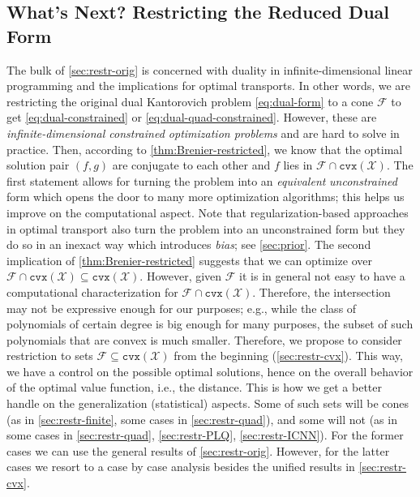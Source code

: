 \documentclass[10pt]{article}
\newcommand{\cvx}{\mathtt{cvx}}
\newcommand{\calF}{\mathcal{F}}
\newcommand{\calX}{\mathcal{X}}
\numberwithin{equation}{section}
\begin{document}
\subsection{What's Next? Restricting the Reduced Dual Form}\label{sec:bridge}

The bulk of \autoref{sec:restr-orig} is concerned with duality in infinite-dimensional linear programming and the implications for optimal transports. In other words, we are restricting the original dual Kantorovich problem \eqref{eq:dual-form} to a cone $\calF$ to get \eqref{eq:dual-constrained} or \eqref{eq:dual-quad-constrained}. However, these are {\em infinite-dimensional constrained optimization problems} and are hard to solve in practice. Then, according to \autoref{thm:Brenier-restricted}, we know that the optimal solution pair $(f,g)$ are conjugate to each other and $f$ lies in $\calF \cap \cvx(\calX)$. The first statement allows for turning the problem into an {\em equivalent} {\em unconstrained} form which opens the door to many more optimization algorithms; this helps us improve on the computational aspect. Note that regularization-based approaches in optimal transport also turn the problem into an unconstrained form but they do so in an inexact way which introduces {\em bias}; see \autoref{sec:prior}. The second implication of \autoref{thm:Brenier-restricted} suggests that we can optimize over $\calF \cap \cvx(\calX) \subseteq \cvx(\calX)$. However, given $\calF$ it is in general not easy to have a computational characterization for $\calF \cap \cvx(\calX)$. Therefore, the intersection may not be expressive enough for our purposes; e.g., while the class of polynomials of certain degree is big enough for many purposes, the subset of such polynomials that are convex is much smaller. Therefore, we propose to consider restriction to sets $\calF \subseteq \cvx(\calX)$ from the beginning (\autoref{sec:restr-cvx}). This way, we have a control on the possible optimal solutions, hence on the overall behavior of the optimal value function, i.e., the distance. This is how we get a better handle on the generalization (statistical) aspects. Some of such sets will be cones (as in \autoref{sec:restr-finite}, some cases in \autoref{sec:restr-quad}), and some will not (as in some cases in \autoref{sec:restr-quad}, \autoref{sec:restr-PLQ}, \autoref{sec:restr-ICNN}). For the former cases we can use the general results of \autoref{sec:restr-orig}. However, for the latter cases we resort to a case by case analysis besides the unified results in \autoref{sec:restr-cvx}. 
\end{document}
